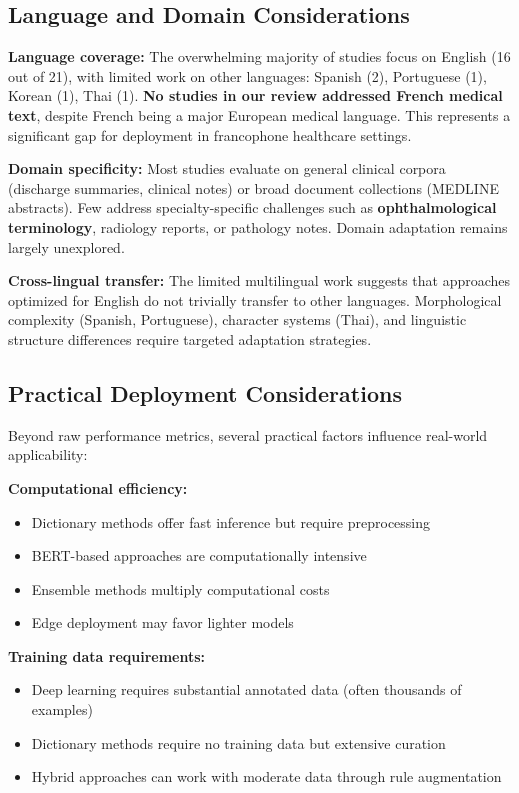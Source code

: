 \subsection{Language and Domain Considerations}

\textbf{Language coverage:} The overwhelming majority of studies focus on English (16 out of 21), with limited work on other languages: Spanish (2), Portuguese (1), Korean (1), Thai (1). \textbf{No studies in our review addressed French medical text}, despite French being a major European medical language. This represents a significant gap for deployment in francophone healthcare settings.

\textbf{Domain specificity:} Most studies evaluate on general clinical corpora (discharge summaries, clinical notes) or broad document collections (MEDLINE abstracts). Few address specialty-specific challenges such as \textbf{ophthalmological terminology}, radiology reports, or pathology notes. Domain adaptation remains largely unexplored.

\textbf{Cross-lingual transfer:} The limited multilingual work suggests that approaches optimized for English do not trivially transfer to other languages. Morphological complexity (Spanish, Portuguese), character systems (Thai), and linguistic structure differences require targeted adaptation strategies.

\subsection{Practical Deployment Considerations}

Beyond raw performance metrics, several practical factors influence real-world applicability:

\textbf{Computational efficiency:}
\begin{itemize}
    \item Dictionary methods offer fast inference but require preprocessing
    \item BERT-based approaches are computationally intensive
    \item Ensemble methods multiply computational costs
    \item Edge deployment may favor lighter models
\end{itemize}

\textbf{Training data requirements:}
\begin{itemize}
    \item Deep learning requires substantial annotated data (often thousands of examples)
    \item Dictionary methods require no training data but extensive curation
    \item Hybrid approaches can work with moderate data through rule augmentation
\end{itemize}

